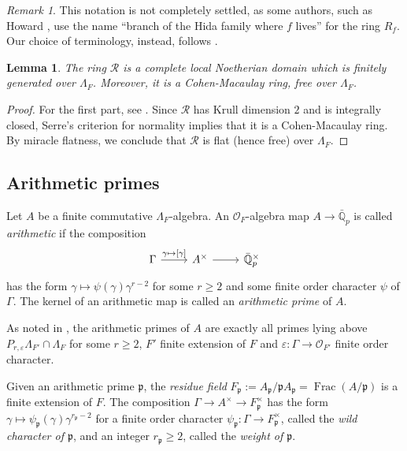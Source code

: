 \documentclass[12pt,reqno]{amsart}
\newtheorem{lemma}[theorem]{Lemma}
\theoremstyle{definition}
\theoremstyle{remark}
\newtheorem{remark}[theorem]{Remark}
\newcommand{\numberset}{\mathbb}
\newcommand{\Q}{\numberset{Q}}
\newcommand{\OF}{\mathcal{O}_F}
\DeclareMathOperator{\Frac}{Frac}
\newcommand{\e}{\varepsilon}
\newcommand{\gL}{\Lambda}
\newcommand{\p}{\mathfrak{p}}
\begin{document}
    \begin{remark}
        This notation is not completely settled, as some authors, such as Howard \cite{Howard07:variation-of-Heegner-points-in-Hida-families}, use the name ``branch of the Hida family where $f$ lives'' for the ring $R_f$. Our choice of terminology, instead, follows \cite{Longo-Vigni11:quaternion-algebras-Hida-families}.
    \end{remark}

    \begin{lemma}
   \label{lem:algebraic-properties-of-R}
       The ring $\mathcal{R}$ is a complete local Noetherian domain which is finitely generated over $\gL_F$. Moreover, it is a Cohen-Macaulay ring, free over $\gL_F$.
   \end{lemma}
   \begin{proof}
       For the first part, see \cite[Proposition 5.2]{Longo-Vigni11:quaternion-algebras-Hida-families}. Since $\mathcal{R}$ has Krull dimension $2$ and is integrally closed, Serre's criterion for normality implies that it is a Cohen-Macaulay ring. By miracle flatness, we conclude that $\mathcal{R}$ is flat (hence free) over $\gL_F$.
   \end{proof}

\subsection{Arithmetic primes}\label{sec:arithmetic-primes}
        Let $A$ be a finite commutative $\gL_F$-algebra. An $\OF$-algebra map $A\to\bar{\Q}_p$ is called \emph{arithmetic} if the composition
        \begin{equation*}
            \begin{tikzcd}
	\Gamma & {A^\times} & {\bar{\Q}_p^\times}
	\arrow["{\gamma\mapsto [\gamma]}", from=1-1, to=1-2]
	\arrow[from=1-2, to=1-3]
        \end{tikzcd}
        \end{equation*}
        has the form $\gamma\mapsto \psi(\gamma)\gamma^{r-2}$ for some $r\ge 2$ and some finite order character $\psi$ of $\Gamma$. The kernel of an arithmetic map is called an \emph{arithmetic prime} of $A$.


    As noted in \cite[§12.7.2 and §12.7.4]{Nekovar06:selmer-complexes}, the arithmetic primes of $A$ are exactly all primes lying above $P_{r,\e}\gL_{F'}\cap\gL_F$ for some $r\ge 2$, $F'$ finite extension of $F$ and $\e:\Gamma\to \mathcal{O}_{F'}$ finite order character. 

    Given an arithmetic prime $\p$, the \emph{residue field} $F_\p:=A_\p/\p A_\p=\Frac(A/\p)$ is a finite extension of $F$. The composition $\Gamma\to A^\times\to F_\p^\times$ has the form $\gamma\mapsto \psi_\p(\gamma)\gamma^{r_\p-2}$ for a finite order character $\psi_\p\colon\Gamma\to F_\p^\times$, called the \emph{wild character of $\p$}, and an integer $r_\p\ge 2$, called the \emph{weight of $\p$}.
\end{document}
